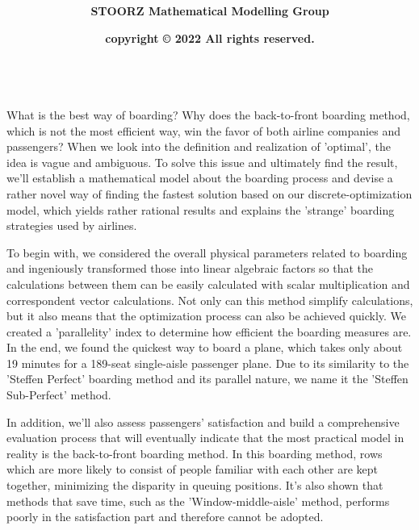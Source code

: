 \documentclass{article}
\title{\Huge\textbf{\color{allandarkblue}\Title}}
\author{\textbf{STOORZ Mathematical Modelling Group}}
\date{\textbf{copyright © 2022 All rights reserved.}}
\theoremstyle{definition}
\theoremstyle{remark}
\numberwithin{equation}{section}
\begin{document}
	\maketitle
	\newpage

	\normalfont{}\selectfont

	\qquad
	\par
	~~
	\\[1.5cm]
	What is the best way of boarding? Why does the back-to-front boarding method, which is not the most efficient way, win the favor of both airline companies and passengers? When we look into the definition and realization of 'optimal', the idea is vague and ambiguous. To solve this issue and ultimately find the result, we'll establish a mathematical model about the boarding process and devise a rather novel way of finding the fastest solution based on our discrete-optimization model, which yields rather rational results and explains the 'strange' boarding strategies used by airlines.

	To begin with, we considered the overall physical parameters related to boarding and ingeniously transformed those into linear algebraic factors so that the calculations between them can be easily calculated with scalar multiplication and correspondent vector calculations. Not only can this method simplify calculations, but it also means that the optimization process can also be achieved quickly. We created a 'parallelity' index to determine how efficient the boarding measures are. In the end, we found the quickest way to board a plane, which takes only about 19 minutes for a 189-seat single-aisle passenger plane. Due to its similarity to the 'Steffen Perfect' boarding method and its parallel nature, we name it the 'Steffen Sub-Perfect' method.

	In addition, we'll also assess passengers' satisfaction and build a comprehensive evaluation process that will eventually indicate that the most practical model in reality is the back-to-front boarding method. In this boarding method, rows which are more likely to consist of people familiar with each other are kept together, minimizing the disparity in queuing positions. It's also shown that methods that save time, such as the 'Window-middle-aisle' method, performs poorly in the satisfaction part and therefore cannot be adopted.
\end{document}
